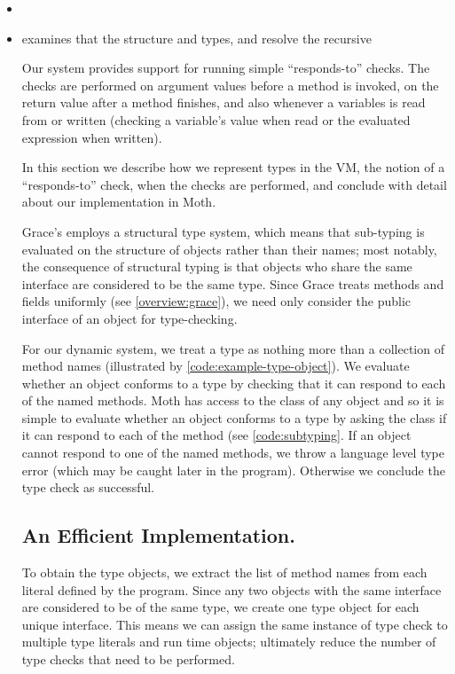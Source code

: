 \begin{itemize}
\item 
\item examines that the structure 
 and types, and resolve the recursive


Our system provides support for running simple ``responds-to'' checks.
The checks are performed on argument values before a method is invoked,
on the return value after a method finishes, and also
whenever a variables is read from or written
(checking a variable's value when read or the evaluated expression when written).

In this section we describe
how we represent types in the VM,
the notion of a ``responds-to'' check,
when the checks are performed, 
and conclude with detail about our implementation in Moth.

Grace's employs a structural type system,
which means that sub-typing is evaluated on the structure of objects
rather than their names;
most notably,
the consequence of structural typing is that objects who share the same interface
are considered to be the same type.
Since Grace treats methods and fields uniformly (see \cref{overview:grace}), 
we need only consider the public interface of an object for type-checking.

For our dynamic system,
we treat a type as nothing more than a collection of method names
(illustrated by \cref{code:example-type-object}).
We evaluate whether an object conforms to a type
by checking that it can respond to each of the named methods.
Moth has access to the class of any object and
so it is simple to evaluate whether an object conforms to a type by
asking the class if it can respond to each of the method
(see \cref{code:subtyping}.
If an object cannot respond to one of the named methods,
we throw a language level type error
(which may be caught later in the program).
Otherwise we conclude the type check as successful.

\subsection{An Efficient Implementation.}

To obtain the type objects,
we extract the list of method names from each literal defined by the program.
Since any two objects with the same interface are considered to be of the same type,
we create one type object for each unique interface. 
This means we can assign the same instance of type check to multiple type literals
and run time objects;
ultimately reduce the number of type checks that need to be performed.


\end{itemize}
